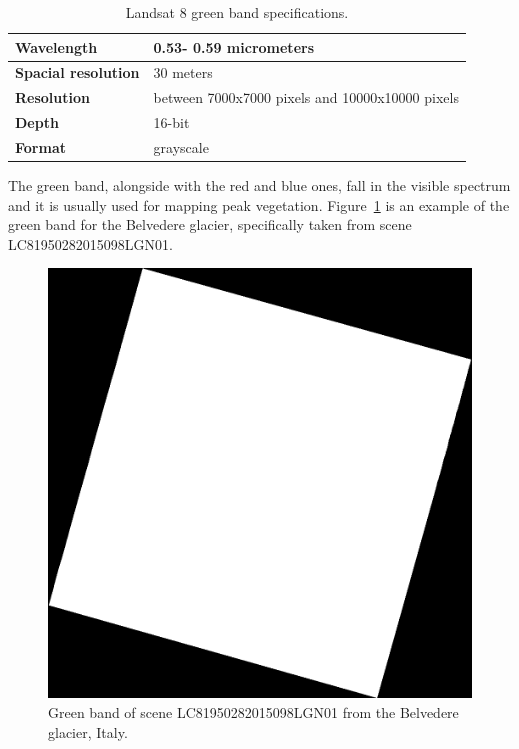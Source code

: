 \documentclass[11pt, a4paper]{report}
\begin{document}
	\begin{table} [h]
		\center
		\begin{tabular} {| l | l |}
			\hline
			\textbf{Wavelength} & {0.53- 0.59 micrometers} \\ [0.2ex]
			\hline
			\textbf{Spacial resolution} & {30 meters} \\ [0.2ex]
			\hline
			\textbf{Resolution} & {between 7000x7000 pixels and 10000x10000 pixels} \\ [0.2ex]
			\hline
			\textbf{Depth} & {16-bit}\\ [0.2ex]
			\hline
			\textbf{Format} & {grayscale}\\ [0.2ex]
			\hline
		\end{tabular}
		\caption{Landsat 8 green band specifications.}
		\label{table:green_table}
	\end{table}
	The green band, alongside with the red and blue ones, fall in the visible spectrum and it is usually used for mapping peak vegetation. Figure~\ref{fig:belvedere_green} is an example of the green band for the Belvedere glacier, specifically taken from scene LC81950282015098LGN01.
	\begin{figure}[h]
		\centering
		\includegraphics[scale=0.3]{../images/LC81950282015098LGN01_B3.png}
		\caption{Green band of scene LC81950282015098LGN01 from the Belvedere glacier, Italy.}
		\label{fig:belvedere_green}
	\end{figure}
	
\end{document}
